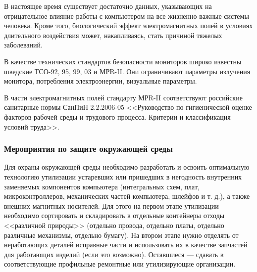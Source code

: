 В настоящее время существует достаточно данных, указывающих на отрицательное влияние работы с компьютером на все жизненно важные системы человека.
Кроме того, биологический эффект электромагнитных полей в условиях длительного воздействия может, накапливаясь, стать причиной тяжелых заболеваний.

В качестве технических стандартов безопасности мониторов широко известны шведские ТСО-92, 95, 99, 03 и МРR-II.
Они ограничивают параметры излучения монитора, потребления электроэнергии, визуальные параметры.

В части электромагнитных полей стандарту МРR-II соответствуют российские санитарные нормы СанПиН 2.2.2006-05 <<Руководство по гигиенической оценке факторов рабочей среды и трудового процесса. Критерии и классификация условий труда>>.

\subsubsection{Мероприятия по защите окружающей среды}
Для охраны окружающей среды необходимо разработать и освоить оптимальную технологию утилизации устаревших или пришедших в негодность внутренних заменяемых компонентов компьютера (интегральных схем, плат, микроконтроллеров, механических частей компьютера, шлейфов и т. д.), а также внешних магнитных носителей.
Для этого на первом этапе утилизации необходимо сортировать и складировать в отдельные контейнеры отходы <<различной природы>> (отдельно провода, отдельно платы, отдельно различные механизмы, отдельно бумагу).
На втором этапе нужно отделять от неработающих деталей исправные части и использовать их в качестве запчастей для работающих изделий (если это возможно).
Оставшиеся --- сдавать в соответствующие профильные ремонтные или утилизирующие организации.
